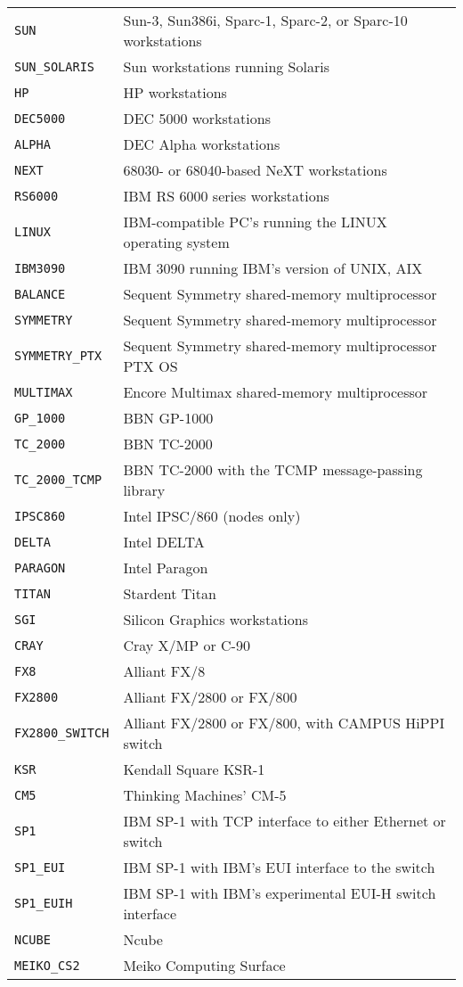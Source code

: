 \begin{iftex}
\begin{tex}
\begin{tabular}{l l}
{\tt SUN} & Sun-3, Sun386i, Sparc-1, Sparc-2, or Sparc-10 workstations \\
{\tt SUN\_SOLARIS} & Sun workstations running Solaris \\
{\tt HP} & HP workstations \\
{\tt DEC5000} &  DEC 5000 workstations \\
{\tt ALPHA} &  DEC Alpha workstations \\
{\tt NEXT} &  68030- or 68040-based NeXT workstations \\
{\tt RS6000} &  IBM RS 6000 series workstations \\
{\tt LINUX}  & IBM-compatible PC's running the LINUX operating system \\
{\tt IBM3090} &  IBM 3090 running IBM's version of UNIX, AIX \\
{\tt BALANCE} &  Sequent Symmetry shared-memory multiprocessor \\
{\tt SYMMETRY} &  Sequent Symmetry shared-memory multiprocessor \\
{\tt SYMMETRY\_PTX} &  Sequent Symmetry shared-memory multiprocessor PTX OS \\
{\tt MULTIMAX} &  Encore Multimax shared-memory multiprocessor \\
{\tt GP\_1000} &  BBN GP-1000 \\
{\tt TC\_2000} &  BBN TC-2000 \\
{\tt TC\_2000\_TCMP} &  BBN TC-2000 with the TCMP message-passing library \\
{\tt IPSC860} &  Intel IPSC/860 (nodes only) \\
{\tt DELTA} &  Intel DELTA  \\
{\tt PARAGON} & Intel Paragon \\
{\tt TITAN} &  Stardent Titan \\
{\tt SGI} &  Silicon Graphics workstations \\
{\tt CRAY} &  Cray X/MP or C-90 \\
{\tt FX8} &  Alliant FX/8 \\
{\tt FX2800} &  Alliant FX/2800 or FX/800 \\
{\tt FX2800\_SWITCH} &  Alliant FX/2800 or FX/800, with CAMPUS HiPPI switch \\
{\tt KSR} &  Kendall Square KSR-1 \\
{\tt CM5} &  Thinking Machines' CM-5 \\
{\tt SP1} & IBM SP-1 with TCP interface to either Ethernet or switch \\
{\tt SP1\_EUI} & IBM SP-1 with IBM's EUI interface to the switch \\
{\tt SP1\_EUIH} & IBM SP-1 with IBM's experimental EUI-H switch interface \\
{\tt NCUBE} & Ncube \\
{\tt MEIKO\_CS2}  & Meiko Computing Surface \\

\end{tabular}
\end{tex}
\end{iftex}

